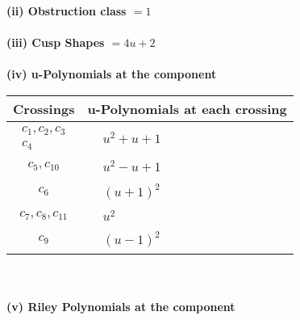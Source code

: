 \documentclass[1p]{elsarticle_modified}
\theoremstyle{definition}
\begin{document}
\flushleft \textbf{(ii) Obstruction class $= 1$}\\~\\
\flushleft \textbf{(iii) Cusp Shapes $= 4 u+2$}\\~\\
\newpage\renewcommand{\arraystretch}{1}
\flushleft \textbf{(iv) u-Polynomials at the component}\newline \\
\begin{tabular}{m{50pt}|m{274pt}}
Crossings & \hspace{64pt}u-Polynomials at each crossing \\
\hline $$\begin{aligned}c_{1},c_{2},c_{3}\\c_{4}\end{aligned}$$&$\begin{aligned}
&u^2+u+1
\end{aligned}$\\
\hline $$\begin{aligned}c_{5},c_{10}\end{aligned}$$&$\begin{aligned}
&u^2- u+1
\end{aligned}$\\
\hline $$\begin{aligned}c_{6}\end{aligned}$$&$\begin{aligned}
&(u+1)^2
\end{aligned}$\\
\hline $$\begin{aligned}c_{7},c_{8},c_{11}\end{aligned}$$&$\begin{aligned}
&u^2
\end{aligned}$\\
\hline $$\begin{aligned}c_{9}\end{aligned}$$&$\begin{aligned}
&(u-1)^2
\end{aligned}$\\
\hline
\end{tabular}\\~\\
\newpage\renewcommand{\arraystretch}{1}
\flushleft \textbf{(v) Riley Polynomials at the component}\newline \\
\end{document}
